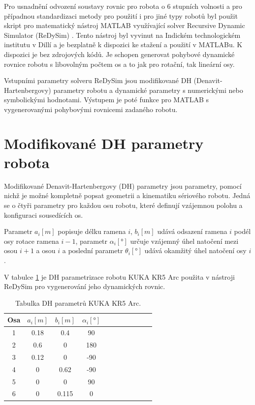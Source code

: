 Pro usnadnění odvození soustavy rovnic pro robota o 6 stupních volnosti a pro případnou standardizaci metody pro použití i pro jiné typy robotů byl použit skript pro matematický nástroj MATLAB využívající solver Recursive Dynamic Simulator (ReDySim) \cite{redysim}. Tento nástroj byl vyvinut na Indickém technologickém institutu v Dillí a je bezplatně k dispozici ke stažení a použití v MATLABu. K dispozici je bez zdrojových kódů. Je schopen generovat pohybové dynamické rovnice robotu s libovolným počtem os a to jak pro rotační, tak lineární osy. 

Vstupními parametry solveru ReDySim jsou modifikované DH (Denavit-Hartenbergovy) parametry robotu a dynamické parametry s numerickými nebo symbolickými hodnotami. Výstupem je poté funkce pro MATLAB s vygenerovanými pohybovými rovnicemi zadaného robotu.  

\section{Modifikované DH parametry robota}

Modifikované Denavit-Hartenbergovy (DH) parametry jsou parametry, pomocí nichž je možné kompletně popsat geometrii a kinematiku sériového robotu. Jedná se o čtyři parametry pro každou osu robotu, které definují vzájemnou polohu a konfiguraci sousedících os. 

Parametr $a_i [m]$ popisuje délku ramena $i$, $b_i [m]$ udává odsazení ramena $i$ podél osy rotace ramena $i-1$, parametr $\alpha_i [\si{\degree}]$ určuje vzájemný úhel natočení mezi osou $i+1$ a osou $i$ a poslední parametr $\theta_i [\si{\degree}]$ udává okamžitý úhel natočení osy $i$.

V tabulce \ref{tab_DH_kuka} je DH parametrizace robotu KUKA KR5 Arc použita v nástroji ReDySim pro vygenerování jeho dynamických rovnic.

\begin{table}[htbp]
  \centering
  \caption{Tabulka DH parametrů KUKA KR5 Arc.}
    \begin{tabular}{c|cccccccccc}
    \multicolumn{1}{c|}{Osa} & \multicolumn{1}{c}{$a_{i} [m]$} & \multicolumn{1}{c}{$b_{i} [m]$} & \multicolumn{1}{c}{$\alpha_{i} [\si{\degree}]$} \\
    \hline
    1     &   0.18  &  0.4   &  90     &     \\
    2     &   0.6   &  0     &  180    &     \\
    3     &   0.12  &  0     &  -90    &     \\
    4     &   0     &  0.62  &  -90    &     \\
    5     &   0     &  0     &  90     &     \\
    6     &   0     &  0.115 &  0      &     \\
    \end{tabular}%
  \label{tab_DH_kuka}%
\end{table}%

